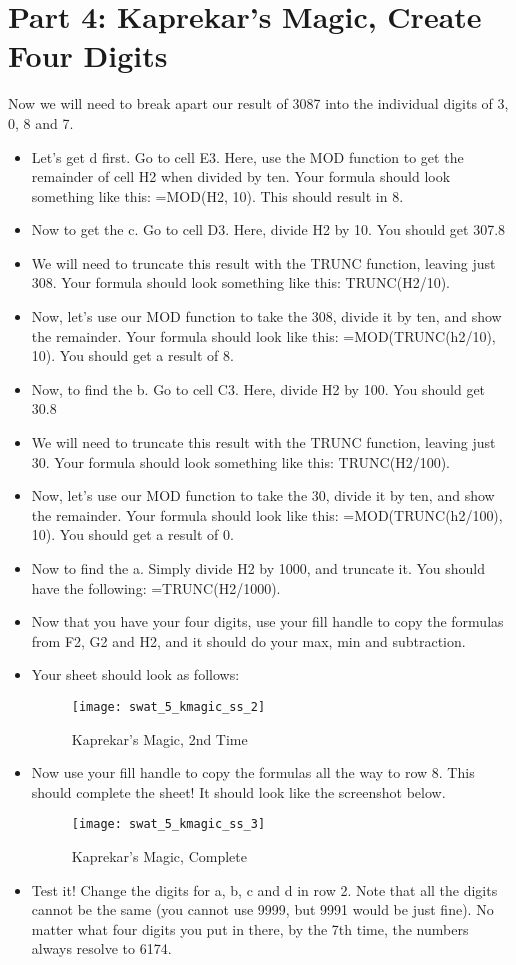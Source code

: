 \documentclass{article}
\begin{document}
\section*{Part 4: Kaprekar's Magic, Create Four Digits}
Now we will need to break apart our result of 3087 into the individual digits of 3, 0, 8 and 7.
\begin{itemize}
    \item Let's get d first.  Go to cell E3.  Here, use the MOD function to get the remainder of cell H2 when divided by ten.  Your formula should look something like this:  =MOD(H2, 10).  This should result in 8.
    \item Now to get the c.  Go to cell D3.  Here, divide H2 by 10.  You should get 307.8
    \item We will need to truncate this result with the TRUNC function, leaving just 308.  Your formula should look something like this:  TRUNC(H2/10).
    \item Now, let's use our MOD function to take the 308, divide it by ten, and show the remainder.  Your formula should look like this:  =MOD(TRUNC(h2/10), 10).  You should get a result of 8.
    \item Now, to find the b.  Go to cell C3.  Here, divide H2 by 100.  You should get 30.8
    \item We will need to truncate this result with the TRUNC function, leaving just 30.  Your formula should look something like this:  TRUNC(H2/100).
    \item Now, let's use our MOD function to take the 30, divide it by ten, and show the remainder.  Your formula should look like this:  =MOD(TRUNC(h2/100), 10).  You should get a result of 0.
    \item Now to find the a.  Simply divide H2 by 1000, and truncate it.  You should have the following:  =TRUNC(H2/1000).
    \item Now that you have your four digits, use your fill handle to copy the formulas from F2, G2 and H2, and it should do your max, min and subtraction.
    \item Your sheet should look as follows:
    \begin{figure}[H]
  		\centering
  		\texttt{[image: swat\_5\_kmagic\_ss\_2]}
  		\caption{Kaprekar's Magic, 2nd Time}
	\end{figure}
	\item Now use your fill handle to copy the formulas all the way to row 8.  This should complete the sheet!  It should look like the screenshot below.
	\begin{figure}[H]
  		\centering
  		\texttt{[image: swat\_5\_kmagic\_ss\_3]}
  		\caption{Kaprekar's Magic, Complete}
	\end{figure}
	\item Test it!  Change the digits for a, b, c and d in row 2.  Note that all the digits cannot be the same (you cannot use 9999, but 9991 would be just fine).  No matter what four digits you put in there, by the 7th time, the numbers always resolve to 6174.
\end{itemize}
\end{document}
